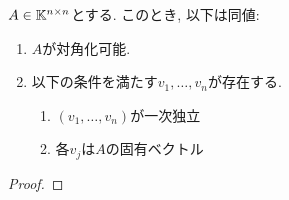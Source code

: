 \begin{prop}
  $A\in\mathbb{K}^{n\times n}$とする.
  このとき, 以下は同値:
  \begin{enumerate}
  \item $A$が対角化可能.
  \item
    以下の条件を満たす$v_1,\ldots,v_n$が存在する.
\begin{enumerate}
\item $(v_1,\ldots,v_n)$が一次独立
\item  各$v_j$は$A$の固有ベクトル
  \end{enumerate}
  \end{enumerate}
\end{prop}
\begin{proof}\end{proof}



